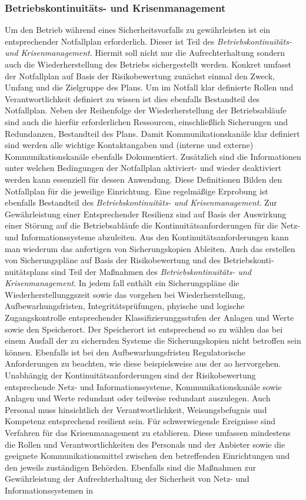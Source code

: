 \documentclass[11pt,a4paper,hidelinks]{article}   %
\begin{document}
            \subsubsection{Betriebskontinuitäts- und Krisenmanagement}
            Um den Betrieb während eines Sicherheitsvorfalls zu gewährleisten ist ein entsprechender Notfallplan erforderlich. Dieser ist Teil des \emph{Betriebskontinuitäts- und Krisenmanagement}. Hiermit soll nicht nur die Aufrechterhaltung sondern auch die Wiederherstellung des Betriebs sichergestellt werden. Konkret umfasst der Notfallplan auf Basis der Risikobewertung zunächst einmal den Zweck, Umfang und die Zielgruppe des Plans. Um im Notfall klar definierte Rollen und Verantwortlichkeit definiert zu wissen ist dies ebenfalls Bestandteil des Notfallplan. Neben der Reihenfolge der Wiederherstellung der Betriebsabläufe sind auch die hierfür erforderlichen Ressourcen, einschließlich Sicherungen und Redundanzen, Bestandteil des Plans. Damit Kommunikationskanäle klar definiert sind werden alle wichtige Kontaktangaben und (interne und externe) Kommunikationskanäle ebenfalls Dokumentiert. Zusätzlich sind die Informationen unter welchen Bedingungen der Notfallplan aktiviert- und wieder deaktiviert werden kann essenziell für dessen Anwendung. Diese Definitionen Bilden den Notfallplan für die jeweilige Einrichtung. Eine regelmäßige Erprobung ist ebenfalls Bestandteil des \emph{Betriebskontinuitäts- und Krisenmanagement}. Zur Gewährleistung einer Entsprechender Resilienz sind auf Basis der Auswirkung einer Störung auf die Betriebsabläufe die Kontinuitätsanforderungen für die Netz- und Informationssysteme abzuleiten. Aus den Kontinuitätsanforderungen kann man wiederum das anfertigen von Sicherungskopien Ableiten. Auch das erstellen von Sicherungspläne auf Basis der Risikobewertung und des Betriebskonti­nuitätsplans sind Teil der Maßnahmen des \emph{Betriebskontinuitäts- und Krisenmanagement}. In jedem fall enthält ein Sicherungspläne die Wiederherstellunggszeit sowie das vorgehen bei Wiederherstellung, Aufbewarhungsfristen, Integritätsprüfungen, phyische und logische Zugangskontrolle entsprechender Klassifizierunggsstufen der Anlagen und Werte sowie den Speicherort. Der Speicherort ist entsprechend so zu wählen das bei einem Ausfall der zu sichernden Systeme die Sicherungskopien nicht betroffen sein können. Ebenfalls ist bei den Aufbewarhungsfristen Regulatorische Anforderungen zu beachten, wie diese beispielsweise aus der \gls{ao} hervorgehen. Unabhängig der Kontinuitätsanforderungen sind der Risikobewertung entsprechende Netz- und Informationssysteme, Kommunikationskanäle sowie Anlagen und Werte redundant oder teilweise redundant auszulegen. Auch Personal muss hinsichtlich der Verantwortlichkeit, Weisungsbefugnis und Kompetenz entsprechend resilient sein. Für schwerwiegende Ereignisse sind Verfahren für das Krisenmanagement zu etablieren. Diese umfassen mindestens die Rollen und Verantwortlichkeiten des Personals und der Anbieter sowie die geeignete Kommunikationsmittel zwischen den betreffenden Einrichtungen  und den jeweils zuständigen Behörden. Ebenfalls sind die Maßnahmen zur Gewährleistung der Aufrechterhaltung der Sicherheit von Netz- und Informationssystemen in 
\end{document}
